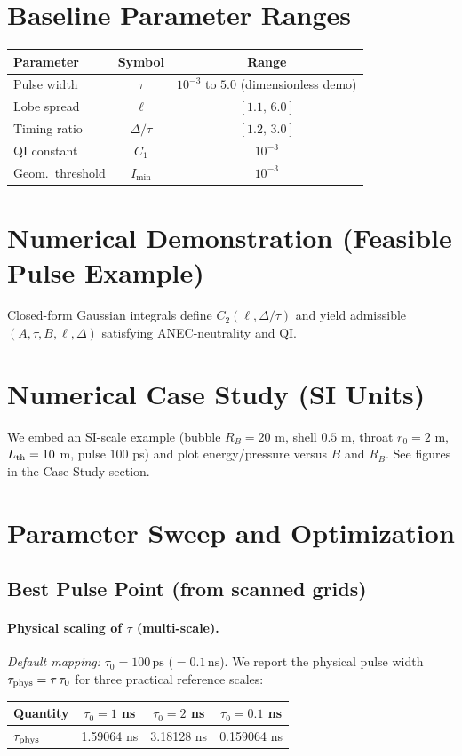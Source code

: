 \documentclass[11pt]{article}
\newcommand{\taudef}{100\,\mathrm{ps}} %
\newcommand{\taudefns}{0.1\,\mathrm{ns}} %
\begin{document}
\section{Baseline Parameter Ranges}
\begin{center}\begin{tabular}{l|c|c}
\hline
Parameter & Symbol & Range \\ \hline
Pulse width & $\tau$ & $10^{-3}$ to $5.0$ (dimensionless demo) \\
Lobe spread & $\ell$ & $[1.1,\,6.0]$ \\
Timing ratio & $\Delta/\tau$ & $[1.2,\,3.0]$ \\
QI constant & $C_1$ & $10^{-3}$ \\
Geom.\ threshold & $I_{\min}$ & $10^{-3}$ \\ \hline
\end{tabular}\end{center}

\section{Numerical Demonstration (Feasible Pulse Example)}
Closed-form Gaussian integrals define $C_2(\ell,\Delta/\tau)$ and yield admissible $(A,\tau,B,\ell,\Delta)$ satisfying ANEC-neutrality and QI.

\section{Numerical Case Study (SI Units)}
We embed an SI-scale example (bubble $R_B=20$ m, shell $0.5$ m, throat $r_0=2$ m, $L_{\rm th}=10$ m, pulse $100$ ps) and plot energy/pressure versus $B$ and $R_B$. See figures in the Case Study section.

\section{Parameter Sweep and Optimization}
\subsection*{Best Pulse Point (from scanned grids)}
\paragraph{Physical scaling of $\tau$ (multi-scale).}\emph{Default mapping:} $\tau_0=\taudef$ ($=\taudefns$).
We report the physical pulse width $\tau_{\rm phys}=\tau\,\tau_0$ for three practical reference scales:
\begin{center}
\begin{tabular}{l|c|c|c}
\hline
Quantity & $\tau_0=1$ ns & $\tau_0=2$ ns & $\tau_0=0.1$ ns \\ \hline
$\tau_{\rm phys}$ & 1.59064 ns & 3.18128 ns & 0.159064 ns \\ \hline
\end{tabular}
\end{center}
\end{document}

